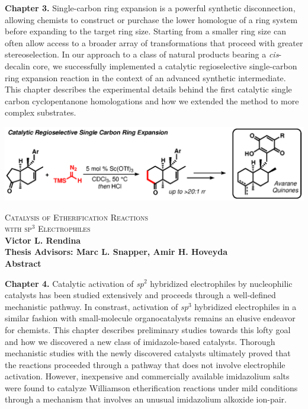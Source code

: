 \pagebreak
\thispagestyle{empty}
\noindent {} \textbf{Chapter 3.} Single-carbon ring expansion is a powerful synthetic
disconnection, allowing chemists to construct or purchase the lower homologue of a ring system before expanding to
the target ring size. Starting from a smaller ring size can often allow access to a broader array of
transformations that proceed with greater stereoselection.  In our approach to a class of natural
products bearing a \textit{cis}-decalin core, we successfully implemented a catalytic regioselective
single-carbon ring expansion reaction in the context of an advanced synthetic intermediate. This
chapter describes the experimental details behind the first catalytic single carbon cyclopentanone
homologations and how we extended the method to more complex substrates.

\begin{center}
\includegraphics[scale=0.8]{chp_singlecarbon_abstract}
 \end{center}
 
 \singlespacing
 \pagebreak
\thispagestyle{empty} 
 \begin{center}
 \textsc{{\Large Catalysis of Etherification Reactions \\with sp$^3$
Electrophiles}}\\
\vspace{5mm}
\textbf{Victor L. Rendina} \\
\vspace{5mm}
\textbf{Thesis Advisors: Marc L. Snapper, Amir H. Hoveyda} \\ 
\vspace{5mm} 
\textbf{Abstract}
 \end{center}
 
 \doublespacing
 \noindent {} \textbf{Chapter 4.} Catalytic activation of \textit{sp$^2$} hybridized
 electrophiles by nucleophilic catalysts has been studied extensively and proceeds through a
 well-defined mechanistic pathway. In constrast, activation of \textit{sp$^3$} hybridized
 electrophiles in a similar fashion with small-molecule organocatalysts remains an elusive endeavor
 for chemists. This chapter describes preliminary studies towards this lofty goal and how we discovered a new class of imidazole-based catalysts. Thorough mechanistic studies with the newly discovered catalysts
 ultimately proved that the reactions proceeded through a pathway that does not involve electrophile
 activation. However, inexpensive and commercially available imidazolium salts were found to
 catalyze Williamson etherification reactions under mild conditions through a mechanism that involves an
 unusual imidazolium alkoxide ion-pair.
 
